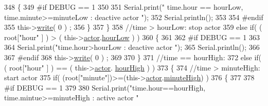 \begin{DoxyCode}
348                             \{
349 \textcolor{preprocessor}{                            #if DEBUG == 1 }
350                     
351                                 Serial.print(\textcolor{stringliteral}{" time.hour == hourLow, time.minute>=minuteLow : deactive
       actor "});
352                                 Serial.println();
353                 
354 \textcolor{preprocessor}{                            #endif  }
355                                 this->\hyperlink{class_cool_board_actor_a958786ff01ea1056ee72c72d439f86da}{write}( 0 ) ;
356                             \}   
357                         \}
358                         \textcolor{comment}{//time > hourLow: stop actor}
359                         \textcolor{keywordflow}{else} \textcolor{keywordflow}{if}( ( root[\textcolor{stringliteral}{"hour"} ] ) > ( this->\hyperlink{class_cool_board_actor_a8f190db9f7a39fddbcef7f152da970e9}{actor}.\hyperlink{struct_cool_board_actor_1_1state_ae7034bf95b36f1392f9de076fa0c8c0f}{hourLow} ) )
360                         \{
361 
362 \textcolor{preprocessor}{                        #if DEBUG == 1 }
363                     
364                             Serial.print(\textcolor{stringliteral}{"time.hour>hourLow : deactive actor "});
365                             Serial.println();
366             
367 \textcolor{preprocessor}{                        #endif      }
368                             this->\hyperlink{class_cool_board_actor_a958786ff01ea1056ee72c72d439f86da}{write}( 0 ) ;
369                                                 
370                         \}
371                         \textcolor{comment}{//time == hourHigh:}
372                         \textcolor{keywordflow}{else} \textcolor{keywordflow}{if}( ( root[\textcolor{stringliteral}{"hour"} ] ) == ( this->\hyperlink{class_cool_board_actor_a8f190db9f7a39fddbcef7f152da970e9}{actor}.
      \hyperlink{struct_cool_board_actor_1_1state_acd1af3ac2382258a5b05497d814adc01}{hourHigh} ) )
373                         \{
374                             \textcolor{comment}{//time > minuteHigh: start actor}
375                             \textcolor{keywordflow}{if}( (root[\textcolor{stringliteral}{"minute"}])>=(this->\hyperlink{class_cool_board_actor_a8f190db9f7a39fddbcef7f152da970e9}{actor}.\hyperlink{struct_cool_board_actor_1_1state_a4bff3d61ead74adb60be224764b93006}{minuteHigh}) )
376                             \{
377                     
378 \textcolor{preprocessor}{                            #if DEBUG == 1 }
379                     
380                                 Serial.print(\textcolor{stringliteral}{"time.hour==hourHigh, time.mintue>=minuteHigh : active actor "}

\end{DoxyCode}
